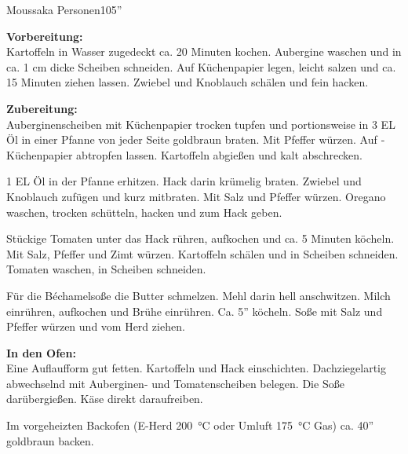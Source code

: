 	\begin{MyRecipe}{Moussaka}{ Personen}{105''}
		
		
		
		\textbf{Vorbereitung:}\\
		Kartoffeln in Wasser zugedeckt ca. 20 Minuten kochen. Aubergine waschen und in ca. 1 cm dicke Scheiben schneiden. Auf ­Küchenpapier legen, leicht salzen und ca. 15 Minuten ziehen lassen. Zwiebel und Knoblauch schälen und fein hacken.\par\bigskip
		
		\textbf{Zubereitung:}\\
		Auberginenscheiben mit Küchenpapier trocken tupfen und portionsweise in 3 EL Öl in einer Pfanne von jeder Seite goldbraun braten. Mit Pfeffer würzen. Auf ­Küchenpapier abtropfen lassen. Kartoffeln abgießen und kalt abschrecken. \par

		1 EL Öl in der Pfanne erhitzen. Hack darin krümelig braten. Zwiebel und Knoblauch zufügen und kurz mitbraten. Mit Salz und Pfeffer würzen. Oregano waschen, trocken schütteln, hacken und zum Hack geben. \par

		Stückige Tomaten unter das Hack rühren, aufkochen und ca. 5 Minuten köcheln. Mit Salz, Pfeffer und Zimt würzen. Kartoffeln schälen und in Scheiben schneiden. Tomaten waschen, in Scheiben schneiden. \par

		Für die Béchamelsoße die Butter schmelzen. Mehl dar­in hell anschwitzen. Milch einrühren, aufkochen und Brühe einrühren. Ca. 5'' köcheln. Soße mit Salz und Pfeffer würzen und vom Herd ziehen.\par\bigskip
		
		\textbf{In den Ofen:}\\
		Eine Auflaufform gut fetten. Kartoffeln und Hack einschichten. Dachziegelartig abwechselnd mit Auberginen- und Tomatenscheiben belegen. Die Soße darübergießen. Käse direkt daraufreiben. \par

		Im vorgeheizten Backofen (E-Herd \SI{200}{\degreeCelsius} oder Umluft \SI{175}{\degreeCelsius} Gas) ca. 40'' goldbraun backen.
				
	\end{MyRecipe}